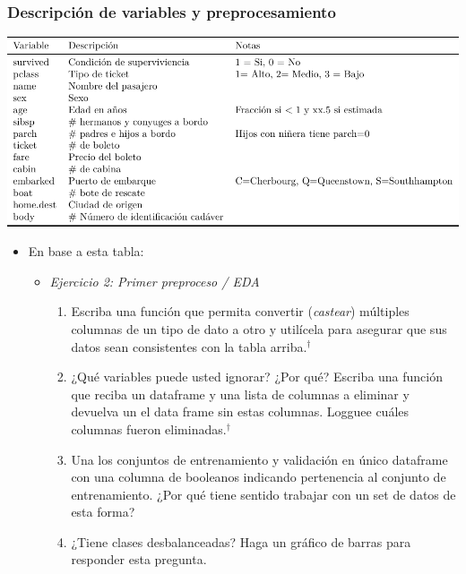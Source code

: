 \documentclass[leqno, 10pt, envcountsect]{beamer}
\numberwithin{equation}{section}
\theoremstyle{definition}
\theoremstyle{example}
\numberwithin{figure}{section}
\numberwithin{table}{section}
\let\olditem\item
\renewcommand{\item}{%
\olditem\vspace{1pt}}
\begin{document}
\begin{frame}[fragile=singleslide]
  \frametitle{Descripción de variables y preprocesamiento}
  \begin{center}
    \includegraphics[scale=0.6]{table_variables.pdf}
  \end{center}
  \begin{itemize}
    \item En base a esta tabla:
      \begin{itemize}
        \item \textit{Ejercicio 2: Primer preproceso / EDA}
          \begin{enumerate}
            \item Escriba una función que permita convertir (\textit{castear})
              múltiples columnas de un tipo de dato a otro y utilícela para
              asegurar que sus datos sean consistentes con la tabla arriba.$^{\dag}$
            \item ¿Qué variables puede usted ignorar? ¿Por qué? Escriba una
              función que reciba un dataframe y una lista de columnas
              a eliminar y devuelva un el data frame sin estas columnas.
              Logguee cuáles columnas fueron eliminadas.$^{\dag}$
            \item Una los conjuntos de entrenamiento y validación en único
              dataframe con una columna de booleanos indicando pertenencia al
              conjunto de entrenamiento. ¿Por qué tiene sentido trabajar con un
              set de datos de esta forma?
            \item ¿Tiene clases desbalanceadas? Haga un gráfico de barras para
              responder esta pregunta.
          \end{enumerate}
      \end{itemize}
  \end{itemize}
\end{frame}
\end{document}
